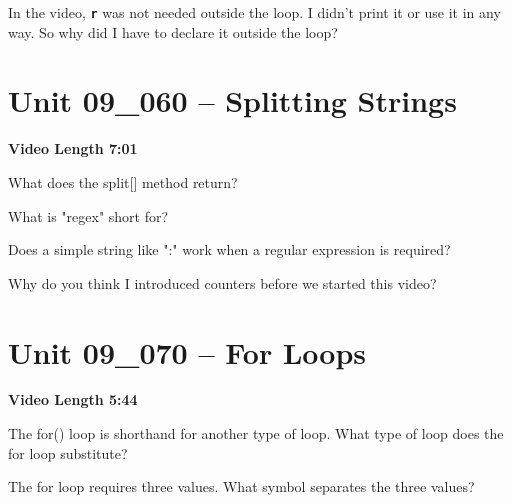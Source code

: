 \documentclass[letterpaper,12pt]{exam}
\newcommand{\unit}{Unit 09}
\begin{document}
\begin{questions}
\begin{samepage}
    \question In the video, \texttt{\textbf{r}} was not needed outside the loop.  I didn't print it or use it in any way.  So why did I have to declare it outside the loop?
    \vspace{5mm}
\end{samepage}



\section*{\unit\_060 -- Splitting Strings} %
\par{\selectfont\textbf{Video Length 7:01}}

\begin{samepage}
    \question What does the split[] method return?
    \vspace{5mm}
\end{samepage}

\begin{samepage}
    \question What is "regex" short for?
    \vspace{5mm}
\end{samepage}

\begin{samepage}
    \question Does a simple string like ":" work when a regular expression is required?
    \vspace{5mm}
\end{samepage}

\begin{samepage}
    \question Why do you think I introduced counters before we started this video?
    \vspace{5mm}
\end{samepage}

\section*{\unit\_070 -- For Loops} %
\par{\selectfont\textbf{Video Length 5:44}}

\begin{samepage}
    \question The for() loop is shorthand for another type of loop.  What type of loop does the for loop substitute?
    \vspace{5mm}
\end{samepage}
\begin{samepage}
    \question The for loop requires three values.  What symbol separates the three values?
    \vspace{5mm}
\end{samepage}


\end{questions}
\end{document}
